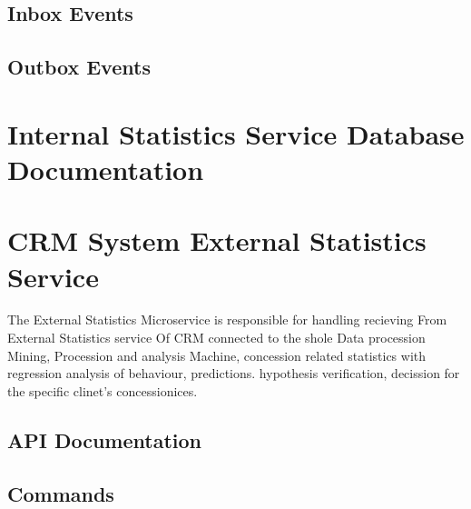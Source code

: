 \documentclass[letterpaper,10pt,english]{sphinxmanual}
\begin{document}
\subsection{Inbox Events}
\label{\detokenize{crm_system/internal_satistics_service:inbox-events}}

\subsection{Outbox Events}
\label{\detokenize{crm_system/internal_satistics_service:outbox-events}}

\section{Internal Statistics Service Database Documentation}
\label{\detokenize{crm_system/internal_satistics_service:internal-statistics-service-database-documentation}}
\sphinxstepscope


\section{CRM System External Statistics Service}
\label{\detokenize{crm_system/external_statistics_service:crm-system-external-statistics-service}}\label{\detokenize{crm_system/external_statistics_service::doc}}
\sphinxAtStartPar
The External  Statistics Microservice is responsible for handling recieving From External Statistics service Of CRM connected to the shole Data procession Mining, Procession and analysis Machine, concession related statistics with regression analysis of behaviour, predictions. hypothesis verification, decission for the specific clinet’s concessionices.



\subsection{API Documentation}
\label{\detokenize{crm_system/external_statistics_service:api-documentation}}

\subsection{Commands}
\label{\detokenize{crm_system/external_statistics_service:commands}}
\end{document}
